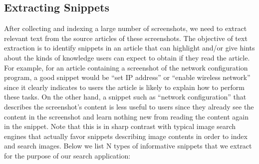 \documentclass{www2010-submission}
\begin{document}
\subsection{Extracting Snippets}
\label{sec:extracting_snippets}

After collecting and indexing a large number of screenshots, we need
to extract relevant text from the source articles of these
screenshots. The objective of text extraction is to identify snippets
in an article that can highlight and/or give hints about the kinds of
knowledge users can expect to obtain if they read the article. For
example, for an article containing a screenshot of the network
configuration program, a good snippet would be ``set IP address'' or
``enable wireless network'' since it clearly indicates to users the
article is likely to explain how to perform these tasks. On the other
hand, a snippet such as ``network configuration'' that describes the
screenshot's content is less useful to users since they already see
the content in the screenshot and learn nothing new from reading the
content again in the snippet. Note that this is in sharp contrast with
typical image search engines that actually favor snippets describing
image contents in order to index and search images. Below we list N
types of informative snippets that we extract for the purpose of our 
search application:
\end{document}

